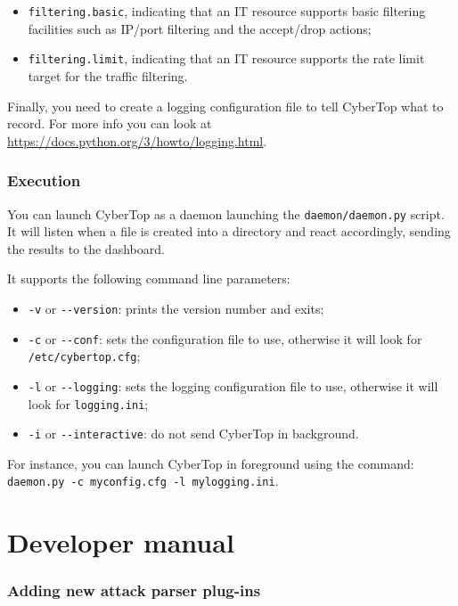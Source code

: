 \documentclass{scrartcl}
\begin{document}
\begin{itemize}
	\item \lstinline|filtering.basic|, indicating that an IT resource supports basic filtering facilities such as IP/port filtering and the accept/drop actions;
	\item \lstinline|filtering.limit|, indicating that an IT resource supports the rate limit target for the traffic filtering.
\end{itemize}

Finally, you need to create a logging configuration file to tell CyberTop what to record. For more info you can look at \url{https://docs.python.org/3/howto/logging.html}.

\section{Execution}

You can launch CyberTop as a daemon launching the \lstinline|daemon/daemon.py| script. It will listen when a file is created into a directory and react accordingly, sending the results to the dashboard.

It supports the following command line parameters:

\begin{itemize}
	\item \lstinline|-v| or \lstinline|--version|: prints the version number and exits;
	\item \lstinline|-c| or \lstinline|--conf|: sets the configuration file to use, otherwise it will look for \lstinline|/etc/cybertop.cfg|;
	\item \lstinline|-l| or \lstinline|--logging|: sets the logging configuration file to use, otherwise it will look for \lstinline|logging.ini|;
	\item \lstinline|-i| or \lstinline|--interactive|: do not send CyberTop in background.
\end{itemize}

For instance, you can launch CyberTop in foreground using the command: \lstinline|daemon.py -c myconfig.cfg -l mylogging.ini|.

\cleardoublepage
\part{Developer manual}

\section{Adding new attack parser plug-ins}
\label{sec:addingNewAttackParserPlugins}
\end{document}
